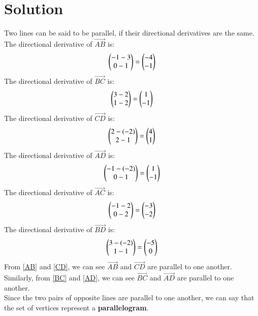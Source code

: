 \documentclass[journal,12pt,twocolumn]{IEEEtran}
\begin{document}
\section{Solution}
Two lines can be said to be parallel, if their directional derivatives are the same.\\
The directional derivative of $\vec{AB}$ is:
\begin{align}
    \begin{pmatrix}-1-3\\0-1\end{pmatrix} = \begin{pmatrix}-4\\-1\end{pmatrix}
    \label{AB}
\end{align}
The directional derivative of $\vec{BC}$ is:
\begin{align}
    \begin{pmatrix}3-2\\1-2\end{pmatrix} = \begin{pmatrix}1\\-1\end{pmatrix}
    \label{BC}
\end{align}
The directional derivative of $\vec{CD}$ is:
\begin{align}
    \begin{pmatrix}2-(-2)\\2-1\end{pmatrix} = \begin{pmatrix}4\\1\end{pmatrix}
    \label{CD}
\end{align}
The directional derivative of $\vec{AD}$ is:
\begin{align}
    \begin{pmatrix}-1-(-2)\\0-1\end{pmatrix} = \begin{pmatrix}1\\-1\end{pmatrix}
    \label{AD}
\end{align}
The directional derivative of $\vec{AC}$ is:
\begin{align}
    \begin{pmatrix}-1-2\\0-2\end{pmatrix} = \begin{pmatrix}-3\\-2\end{pmatrix}
    \label{AC}
\end{align}
The directional derivative of $\vec{BD}$ is:
\begin{align}
    \begin{pmatrix}3-(-2)\\1-1\end{pmatrix} = \begin{pmatrix}-5\\0\end{pmatrix}
    \label{BD}
\end{align}
From \eqref{AB} and \eqref{CD}, we can see $\vec{AB}$ and $\vec{CD}$ are parallel to one another. Similarly, from \eqref{BC} and \eqref{AD}, we can see $\vec{BC}$ and $\vec{AD}$ are parallel to one another.\\
Since the two pairs of opposite lines are parallel to one another, we can say that the set of vertices represent a \textbf{parallelogram}.\\
\end{document}
